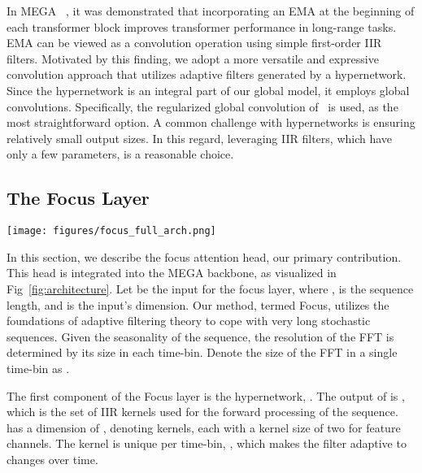 \documentclass[11pt]{article}
\begin{document}
 In MEGA ~\cite{ma2022mega}, it was demonstrated that incorporating an EMA at the beginning of each transformer block improves transformer performance in long-range tasks. EMA can be viewed as a convolution operation using simple first-order IIR filters. Motivated by this finding, we adopt a more versatile and expressive convolution approach that utilizes adaptive filters generated by a hypernetwork. Since the hypernetwork is an integral part of our global model, it employs global convolutions. Specifically, the regularized global convolution of~\cite{fu2023simple} is used, as the most straightforward option. A common challenge with hypernetworks is ensuring relatively small output sizes. In this regard, leveraging IIR filters, which have only a few parameters, is a reasonable choice.

\subsection{The Focus Layer}
\begin{figure*}[t]
    \centering
    \texttt{[image: figures/focus\_full\_arch.png]}
    \caption{Focus Architecture: (a) The architecture of a single head. (b) The obtained layer. (c) The entire model. The architecture of the model and layer are defined similarly to MEGA~\cite{ma2022mega}. Blocks in blue are not learned, while blocks in red are learned parameters.  (serial to parallel) and  (parallel to serial) are the chunking and the de-chunking operations, respectively.}
    \label{fig:architecture}
\end{figure*}

In this section, we describe the focus attention head, our primary contribution. This head is integrated into the MEGA backbone, as visualized in Fig~\ref{fig:architecture}.
Let  be the input for the focus layer, where ,  is the sequence length, and  is the input's dimension.
Our method, termed Focus, utilizes the foundations of adaptive filtering theory to cope with very long stochastic sequences.
Given the seasonality of the sequence, the resolution of the FFT is determined by its size in each time-bin. Denote the size of the FFT in a single time-bin as .

The first component of the Focus layer is the hypernetwork, . The output of  is , which is the set of IIR kernels used for the forward processing of the sequence.  has a dimension of , denoting  kernels, each with a kernel size of two for  feature channels. The kernel is unique per time-bin, , which makes the filter adaptive to changes over time. 
\end{document}
